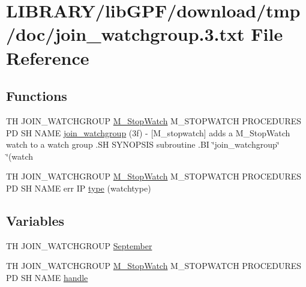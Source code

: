\hypertarget{join__watchgroup_83_8txt}{}\section{L\+I\+B\+R\+A\+R\+Y/lib\+G\+P\+F/download/tmp/doc/join\+\_\+watchgroup.3.txt File Reference}
\label{join__watchgroup_83_8txt}
\subsection*{Functions}
\begin{DoxyCompactItemize}
\item 
TH J\+O\+I\+N\+\_\+\+W\+A\+T\+C\+H\+G\+R\+O\+UP \hyperlink{option__stopwatch_83_8txt_aa2011fc45a5e502e87ee50996a8a9305}{M\+\_\+\+Stop\+Watch} M\+\_\+\+S\+T\+O\+P\+W\+A\+T\+CH P\+R\+O\+C\+E\+D\+U\+R\+ES PD SH N\+A\+ME \hyperlink{join__watchgroup_83_8txt_ac3b8dababa54df484eadaefd83766987}{join\+\_\+watchgroup} (3f) -\/ \mbox{[}\+M\+\_\+stopwatch\mbox{]} adds a M\+\_\+\+Stop\+Watch watch to a watch group .\+S\+H S\+Y\+N\+O\+P\+S\+I\+S subroutine .\+B\+I \char`\"{}join\+\_\+watchgroup\char`\"{} \char`\"{}(watch
\item 
TH J\+O\+I\+N\+\_\+\+W\+A\+T\+C\+H\+G\+R\+O\+UP \hyperlink{option__stopwatch_83_8txt_aa2011fc45a5e502e87ee50996a8a9305}{M\+\_\+\+Stop\+Watch} M\+\_\+\+S\+T\+O\+P\+W\+A\+T\+CH P\+R\+O\+C\+E\+D\+U\+R\+ES PD SH N\+A\+ME err IP \hyperlink{join__watchgroup_83_8txt_a88f3702cb290b5d675ea8ffcbe5d0048}{type} (watchtype)
\end{DoxyCompactItemize}
\subsection*{Variables}
\begin{DoxyCompactItemize}
\item 
TH J\+O\+I\+N\+\_\+\+W\+A\+T\+C\+H\+G\+R\+O\+UP \hyperlink{join__watchgroup_83_8txt_ab585e085cf3d3bd96c1d9e01f9a0839b}{September}
\item 
TH J\+O\+I\+N\+\_\+\+W\+A\+T\+C\+H\+G\+R\+O\+UP \hyperlink{option__stopwatch_83_8txt_aa2011fc45a5e502e87ee50996a8a9305}{M\+\_\+\+Stop\+Watch} M\+\_\+\+S\+T\+O\+P\+W\+A\+T\+CH P\+R\+O\+C\+E\+D\+U\+R\+ES PD SH N\+A\+ME \hyperlink{join__watchgroup_83_8txt_a85bcd8db808fcc8cfc2b3e95e1e7d847}{handle}
\end{DoxyCompactItemize}



